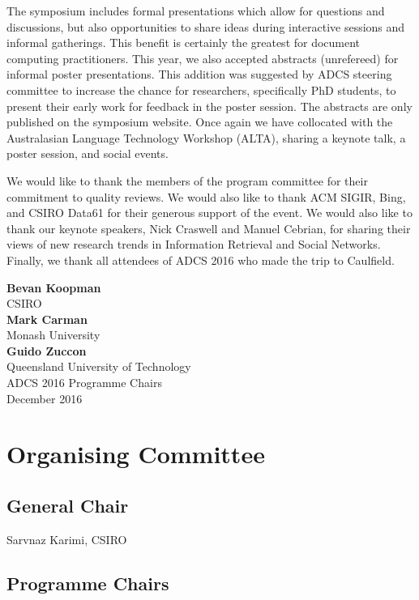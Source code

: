 \documentclass[a4paper]{article}
\begin{document}
The symposium includes formal presentations which allow for questions and
discussions, but also opportunities to share ideas during interactive sessions
and informal gatherings. This benefit is certainly the greatest for document
computing practitioners. This year, we also accepted abstracts (unrefereed) for informal poster presentations. This addition was suggested by ADCS steering committee to increase the chance for researchers, specifically PhD students, to present their early work for feedback in the poster session. The abstracts are only published on the symposium website. Once again we have collocated with the Australasian
Language Technology Workshop (ALTA), sharing  a  keynote  talk, a poster session, and social events.

We would like to thank the members of the program committee for their
commitment to quality reviews. We would also like to thank ACM SIGIR, Bing, and
CSIRO Data61 for their generous support of the event. We would
also like to thank our keynote speakers, Nick Craswell and Manuel Cebrian, for sharing their views of new
research trends in Information Retrieval and Social Networks. Finally, we thank all attendees of
ADCS 2016 who made the trip to Caulfield.

\vspace{1cm}

\begin{flushright}\noindent
\textbf{Bevan Koopman}\\
CSIRO \\[.1in]
\textbf{Mark Carman}\\
Monash University\\[.1in]
\textbf{Guido Zuccon}\\
Queensland University of Technology \\[.1in]
ADCS 2016 Programme Chairs\\
December 2016
\end{flushright}

\newpage


\section*{Organising Committee}


\subsection*{General Chair}

Sarvnaz Karimi, CSIRO


\subsection*{Programme Chairs}
\end{document}
